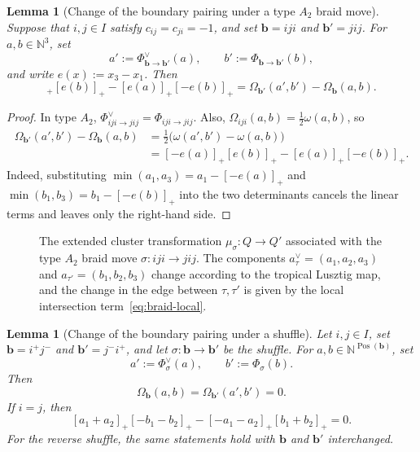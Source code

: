 \documentclass[10pt,a4paper]{article}
\newtheorem{lemma}[theorem]{Lemma}
\theoremstyle{definition}
\theoremstyle{remark}
\begin{document}
\begin{lemma}[Change of the boundary pairing under a type \(A_2\) braid move]
\label{lem:component-A2-finite-identity}
Suppose that \(i,j\in I\) satisfy \(c_{ij}=c_{ji}=-1\), and set
\(\mathbf b=iji\) and \(\mathbf b'=jij\).  For \(a,b\in\mathbb N^3\), set
\[
 a':=\Phi_{\mathbf b\to\mathbf b'}^\vee(a),
 \qquad
 b':=\Phi_{\mathbf b\to\mathbf b'}(b),
\]
and write \(e(x):=x_3-x_1\).  Then
\begin{equation}
 [-e(a)]_+[e(b)]_+-[e(a)]_+[-e(b)]_+
 =\Omega_{\mathbf b'}(a',b')-\Omega_{\mathbf b}(a,b).
 \label{eq:component-A2-finite-check}
\end{equation}
\end{lemma}

\begin{proof}
In type \(A_2\), \(\Phi_{iji\to jij}^\vee=\Phi_{iji\to jij}\).  Also,
$\Omega_{iji}(a,b)=\frac12\omega(a,b)$, so
\begin{align*}
 \Omega_{\mathbf b'}(a',b')-\Omega_{\mathbf b}(a,b)
 &=\frac12\bigl(\omega(a',b')-\omega(a,b)\bigr)\\
 &=[-e(a)]_+[e(b)]_+-[e(a)]_+[-e(b)]_+.
\end{align*}
Indeed, substituting \(\min(a_1,a_3)=a_1-[-e(a)]_+\) and
\(\min(b_1,b_3)=b_1-[-e(b)]_+\) into the two determinants cancels the linear
terms and leaves only the right-hand side.
\end{proof}

\begin{figure}[htbp]
 \centering
 
 \caption{The extended cluster transformation \(\mu_\sigma:Q\to Q'\)
 associated with the type \(A_2\) braid move \(\sigma:iji\to jij\).  The
 components \(a_\tau^\vee=(a_1,a_2,a_3)\) and
 \(a_{\tau'}=(b_1,b_2,b_3)\) change according to the tropical Lusztig map, and
 the change in the edge between \(\tau,\tau'\) is given by the local
 intersection term~\eqref{eq:braid-local}.}
 \label{fig:a2-extended-mutation-local-intersection}
\end{figure}

\begin{lemma}[Change of the boundary pairing under a shuffle]
\label{lem:component-shuffle-finite-identity}
Let \(i,j\in I\), set \(\mathbf b=i^+j^-\) and \(\mathbf b'=j^-i^+\), and let
\(\sigma:\mathbf b\to\mathbf b'\) be the shuffle.  For
\(a,b\in\mathbb N^{\operatorname{Pos}(\mathbf b)}\), set
\[
 a':=\Phi_\sigma^\vee(a),\qquad
 b':=\Phi_\sigma(b).
\]
Then
\[
 \Omega_{\mathbf b}(a,b)=\Omega_{\mathbf b'}(a',b')=0.
\]
If \(i=j\), then
\[
 [a_1+a_2]_+[-b_1-b_2]_+
 -[-a_1-a_2]_+[b_1+b_2]_+=0.
\]
For the reverse shuffle, the same statements hold with \(\mathbf b\) and
\(\mathbf b'\) interchanged.
\end{lemma}
\end{document}
